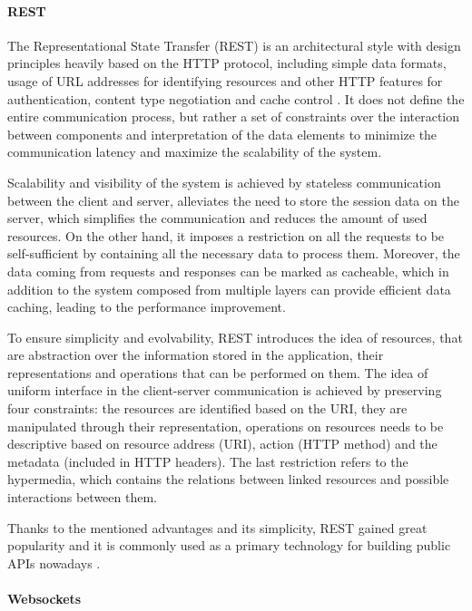 \paragraph*{REST}

The Representational State Transfer (REST) is an architectural style with design principles heavily based on the HTTP protocol, including simple data formats, usage of URL addresses for identifying resources and other HTTP features for authentication, content type negotiation and cache control \cite{RESTPrincipledDesingOfModernWebArchitecture}. It does not define the entire communication process, but rather a set of constraints over the interaction between components and interpretation of the data elements to minimize the communication latency and maximize the scalability of the system.

Scalability and visibility of the system is achieved by stateless communication between the client and server, alleviates the need to store the session data on the server, which simplifies the communication and reduces the amount of used resources. On the other hand, it imposes a restriction on all the requests to be self-sufficient by containing all the necessary data to process them. Moreover, the data coming from requests and responses can be marked as cacheable, which in addition to the system composed from multiple layers can provide efficient data caching, leading to the performance improvement.

To ensure simplicity and evolvability, REST introduces the idea of resources, that are abstraction over the information stored in the application, their representations and operations that can be performed on them.
The idea of uniform interface in the client-server communication is achieved by preserving four constraints: the resources are identified based on the URI, they are manipulated through their representation, operations on resources needs to be descriptive based on resource address (URI), action (HTTP method) and the metadata (included in HTTP headers). The last restriction refers to the hypermedia, which contains the relations between linked resources and possible interactions between them.

Thanks to the mentioned advantages and its simplicity, REST gained great popularity and it is commonly used as a primary technology for building public APIs nowadays \cite{APIDesignInDistributedSystems}.

\paragraph*{Websockets}


